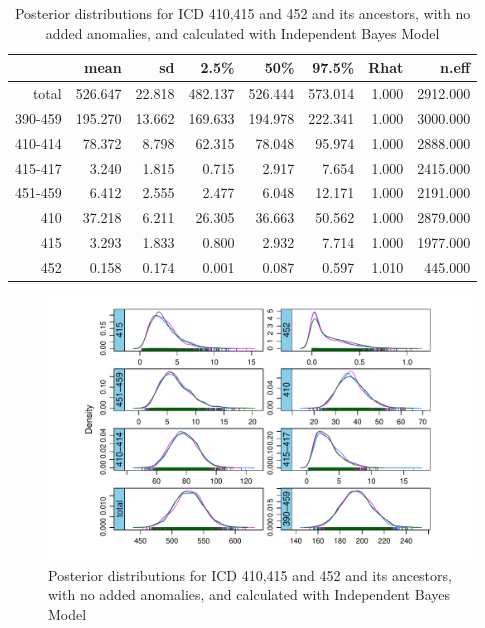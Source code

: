 \begin{table}[!t]
	\centering
	\begin{tabular}{rrrrrrrr}
		\hline
		& mean & sd & 2.5\% & 50\% & 97.5\% & Rhat & n.eff \\ 
		\hline
		total & 526.647 & 22.818 & 482.137 & 526.444 & 573.014 & 1.000 & 2912.000 \\ 
		390-459 & 195.270 & 13.662 & 169.633 & 194.978 & 222.341 & 1.000 & 3000.000 \\ 
		410-414 & 78.372 & 8.798 & 62.315 & 78.048 & 95.974 & 1.000 & 2888.000 \\ 
		415-417 & 3.240 & 1.815 & 0.715 & 2.917 & 7.654 & 1.000 & 2415.000 \\ 
		451-459 & 6.412 & 2.555 & 2.477 & 6.048 & 12.171 & 1.000 & 2191.000 \\ 
		410 & 37.218 & 6.211 & 26.305 & 36.663 & 50.562 & 1.000 & 2879.000 \\ 
		415 & 3.293 & 1.833 & 0.800 & 2.932 & 7.714 & 1.000 & 1977.000 \\ 
		452 & 0.158 & 0.174 & 0.001 & 0.087 & 0.597 & 1.010 & 445.000 \\ 
		\hline
	\end{tabular}
	\caption{Posterior distributions for ICD 410,415 and 452 and its ancestors, with no added anomalies, and calculated with Independent Bayes Model} 
	\label{tab:postsumnorm.mimic}
\end{table}

\begin{figure}[!h]
	\centering
	\includegraphics[width=1\linewidth]{../../R-codes/JAGS/plots/mimic/Densitynorm}
	\caption{Posterior distributions for ICD 410,415 and 452 and its ancestors, with no added anomalies, and calculated with Independent Bayes Model}
	\label{fig:densitynorm}
\end{figure}

